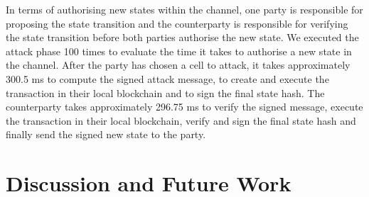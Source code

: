 \documentclass{llncs}
\newcommand{\battleshipbegin}{\mathsf{BS.begingame}}
\begin{document}
In terms of authorising new states within the channel, one party is responsible for proposing the state transition and the counterparty is responsible for verifying the state transition before both parties authorise the new state. 
We executed the attack phase 100 times to evaluate the time it takes to authorise a new state in the channel. 
After the party has chosen a cell to attack, it takes approximately 300.5 ms to compute the signed attack message, to create and execute the transaction in their local blockchain and to sign the final state hash. 
The counterparty takes approximately 296.75 ms to verify the signed message, execute the transaction in their local blockchain, verify and sign the final state hash and finally send the signed new state to the party. 


\section{Discussion and Future Work} 


%
%

\end{document}
